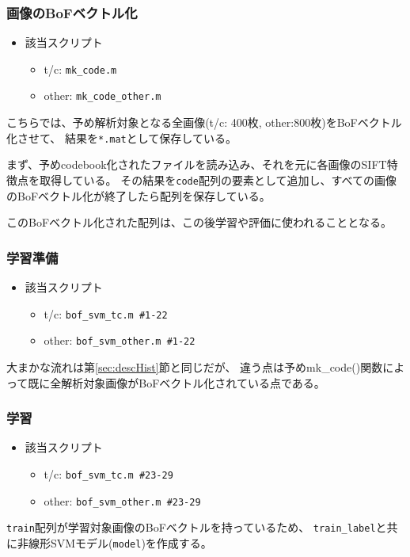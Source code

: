 \documentclass[11pt,a4paper, uplatex]{jsreport}
\begin{document}
\subsubsection{画像のBoFベクトル化}
\begin{itemize}
  \item 該当スクリプト
  \begin{itemize}
    \item t/c: \texttt{mk_code.m}
    \item other: \texttt{mk_code_other.m}
  \end{itemize}
\end{itemize}
こちらでは、予め解析対象となる全画像(t/c: 400枚, other:800枚)をBoFベクトル化させて、
結果を\texttt{*.mat}として保存している。

まず、予めcodebook化されたファイルを読み込み、それを元に各画像のSIFT特徴点を取得している。
その結果を\texttt{code}配列の要素として追加し、すべての画像のBoFベクトル化が終了したら配列を保存している。

このBoFベクトル化された配列は、この後学習や評価に使われることとなる。

\subsubsection{学習準備}
\begin{itemize}
  \item 該当スクリプト
  \begin{itemize}
    \item t/c: \texttt{bof_svm_tc.m \#1-22}
    \item other: \texttt{bof_svm_other.m \#1-22}
  \end{itemize}
\end{itemize}
大まかな流れは第\ref{sec:descHist}節と同じだが、
違う点は予めmk_code()関数によって既に全解析対象画像がBoFベクトル化されている点である。
\subsubsection{学習}
\begin{itemize}
  \item 該当スクリプト
  \begin{itemize}
    \item t/c: \texttt{bof_svm_tc.m \#23-29}
    \item other: \texttt{bof_svm_other.m \#23-29}
  \end{itemize}
\end{itemize}
\texttt{train}配列が学習対象画像のBoFベクトルを持っているため、
\texttt{train_label}と共に非線形SVMモデル(\texttt{model})を作成する。
\end{document}
